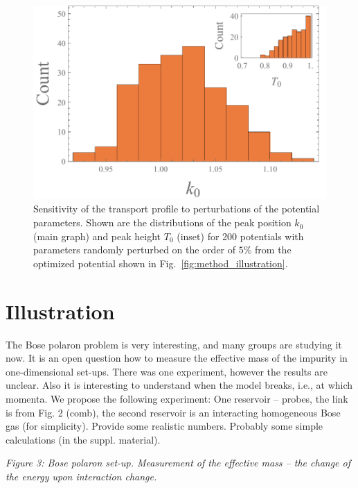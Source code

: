 \documentclass[twocolumn,amsmath,amssymb,showpacs,prl,superscriptaddress,aps]{revtex4-1}
\begin{document}
\begin{figure}
   \includegraphics[width=1\linewidth]{figures/plot_sensitivity.pdf}
 \caption[Sensitivity Plot]{Sensitivity of the transport profile to perturbations of the potential parameters. Shown are the distributions of the peak position $k_0$ (main graph) and peak height $T_0$ (inset) for 200 potentials with parameters randomly perturbed on the order of $5\%$ from the optimized potential shown in Fig.~\ref{fig:method_illustration}. }
 \label{fig:sensitivity}
\end{figure}



\section{Illustration}

The Bose polaron problem is very interesting, and many groups are studying it now. It is an open question how to measure the effective mass of the impurity in one-dimensional set-ups. There was one experiment, however the results are unclear. Also it is interesting to understand when the model breaks, i.e., at which momenta. We propose the following experiment: One reservoir -- probes, the link is from Fig. 2 (comb), the second reservoir is an interacting homogeneous Bose gas (for simplicity). Provide some realistic numbers. Probably some simple calculations (in the suppl. material). 

{\it Figure 3: Bose polaron set-up. Measurement of the effective mass -- the change of the energy upon interaction change.}
\end{document}
